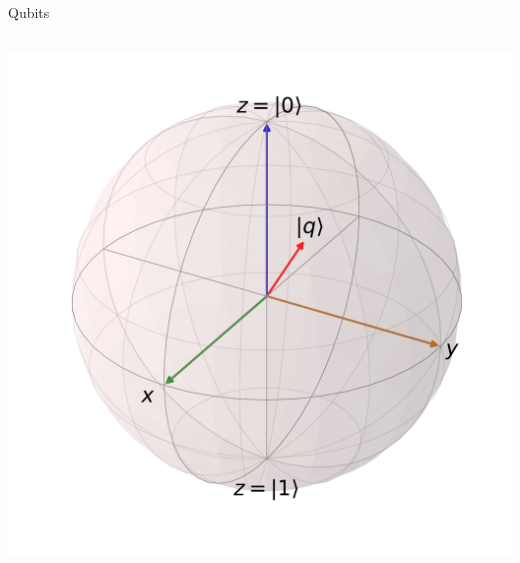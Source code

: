 \documentclass[14pt]{beamer}
\let\olditem\item
\renewcommand{\item}{%
\olditem\vspace{10pt}}
\begin{document}
\begin{frame}{Qubits}
\begin{columns}[T]
\begin{column}{.5\textwidth}
\begin{block}{}
		\includegraphics[width=1\textwidth]{../resources/pdfs/custom_Bloch_sphere.pdf}
	\end{block}
	\end{column}
\end{columns}
\end{frame}

\end{document}
